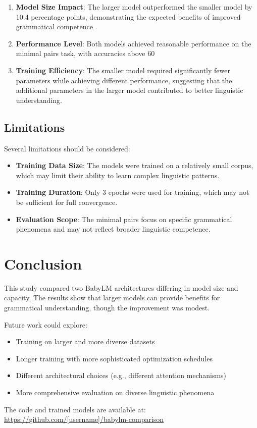\documentclass[11pt,a4paper]{article}
\begin{document}
\begin{enumerate}
    \item \textbf{Model Size Impact}: The larger model outperformed the smaller model by 10.4 percentage points, demonstrating the expected benefits of improved grammatical competence .
    
    \item \textbf{Performance Level}: Both models achieved reasonable performance on the minimal pairs task, with accuracies above 60%
    
    \item \textbf{Training Efficiency}: The smaller model required significantly fewer parameters while achieving different performance, suggesting that the additional parameters in the larger model contributed to better linguistic understanding.
\end{enumerate}

\subsection{Limitations}

Several limitations should be considered:
\begin{itemize}
    \item \textbf{Training Data Size}: The models were trained on a relatively small corpus, which may limit their ability to learn complex linguistic patterns.
    \item \textbf{Training Duration}: Only 3 epochs were used for training, which may not be sufficient for full convergence.
    \item \textbf{Evaluation Scope}: The minimal pairs focus on specific grammatical phenomena and may not reflect broader linguistic competence.
\end{itemize}

\section{Conclusion}

This study compared two BabyLM architectures differing in model size and capacity. The results show that larger models can provide benefits for grammatical understanding, though the improvement was modest.

Future work could explore:
\begin{itemize}
    \item Training on larger and more diverse datasets
    \item Longer training with more sophisticated optimization schedules
    \item Different architectural choices (e.g., different attention mechanisms)
    \item More comprehensive evaluation on diverse linguistic phenomena
\end{itemize}

The code and trained models are available at: \url{https://github.com/[username]/babylm-comparison}
\end{document}
